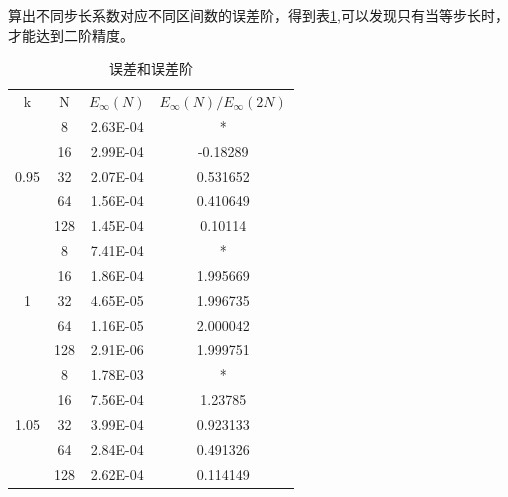 \documentclass[withoutpreface,bwprint]{cumcmthesis} %
\begin{document}
	算出不同步长系数对应不同区间数的误差阶，得到表\ref{tab:1},可以发现只有当等步长时，才能达到二阶精度。
	\begin{table}[htbp]
	\centering
	\caption{误差和误差阶}
	\begin{tabular}{cccc}
	\toprule[1.5pt]
	k     & N     & \multicolumn{1}{l}{$E_{\infty}(N)$} & \multicolumn{1}{l}{$E_{\infty}(N)/E_{\infty}(2N)$} \\
	\multirow{5}[0]{*}{0.95} & 8     & 2.63E-04 & \multicolumn{1}{c}{*} \\
	& 16    & 2.99E-04 & -0.18289 \\
	& 32    & 2.07E-04 & 0.531652 \\
	& 64    & 1.56E-04 & 0.410649 \\
	& 128   & 1.45E-04 & 0.10114 \\
	\hline
	\multirow{5}[0]{*}{1} & 8     & 7.41E-04 & \multicolumn{1}{c}{*} \\
	& 16    & 1.86E-04 & 1.995669 \\
	& 32    & 4.65E-05 & 1.996735 \\
	& 64    & 1.16E-05 & 2.000042 \\
	& 128   & 2.91E-06 & 1.999751 \\
	\hline
	\multirow{5}[0]{*}{1.05} & 8     & 1.78E-03 & \multicolumn{1}{c}{*} \\
	& 16    & 7.56E-04 & 1.23785 \\
	& 32    & 3.99E-04 & 0.923133 \\
	& 64    & 2.84E-04 & 0.491326 \\
	& 128   & 2.62E-04 & 0.114149 \\
	\bottomrule[1.5pt]
	\end{tabular}%
	\label{tab:1}%
	\end{table}%

	
\end{document}
